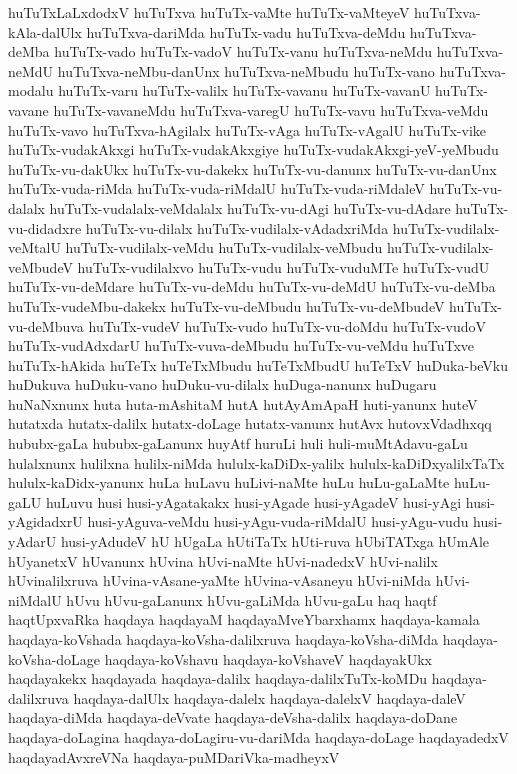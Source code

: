 {huTuTxLaLxdodxV
huTuTxva
huTuTx-vaMte
huTuTx-vaMteyeV
huTuTxva-kAla-dalUlx
huTuTxva-dariMda
huTuTx-vadu
huTuTxva-deMdu
huTuTxva-deMba
huTuTx-vado
huTuTx-vadoV
huTuTx-vanu
huTuTxva-neMdu
huTuTxva-neMdU
huTuTxva-neMbu-danUnx
huTuTxva-neMbudu
huTuTx-vano
huTuTxva-modalu
huTuTx-varu
huTuTx-valilx
huTuTx-vavanu
huTuTx-vavanU
huTuTx-vavane
huTuTx-vavaneMdu
huTuTxva-varegU
huTuTx-vavu
huTuTxva-veMdu
huTuTx-vavo
huTuTxva-hAgilalx
huTuTx-vAga
huTuTx-vAgalU
huTuTx-vike
huTuTx-vudakAkxgi
huTuTx-vudakAkxgiye
huTuTx-vudakAkxgi-yeV-yeMbudu
huTuTx-vu-dakUkx
huTuTx-vu-dakekx
huTuTx-vu-danunx
huTuTx-vu-danUnx
huTuTx-vuda-riMda
huTuTx-vuda-riMdalU
huTuTx-vuda-riMdaleV
huTuTx-vu-dalalx
huTuTx-vudalalx-veMdalalx
huTuTx-vu-dAgi
huTuTx-vu-dAdare
huTuTx-vu-didadxre
huTuTx-vu-dilalx
huTuTx-vudilalx-vAdadxriMda
huTuTx-vudilalx-veMtalU
huTuTx-vudilalx-veMdu
huTuTx-vudilalx-veMbudu
huTuTx-vudilalx-veMbudeV
huTuTx-vudilalxvo
huTuTx-vudu
huTuTx-vuduMTe
huTuTx-vudU
huTuTx-vu-deMdare
huTuTx-vu-deMdu
huTuTx-vu-deMdU
huTuTx-vu-deMba
huTuTx-vudeMbu-dakekx
huTuTx-vu-deMbudu
huTuTx-vu-deMbudeV
huTuTx-vu-deMbuva
huTuTx-vudeV
huTuTx-vudo
huTuTx-vu-doMdu
huTuTx-vudoV
huTuTx-vudAdxdarU
huTuTx-vuva-deMbudu
huTuTx-vu-veMdu
huTuTxve
huTuTx-hAkida
huTeTx
huTeTxMbudu
huTeTxMbudU
huTeTxV
huDuka-beVku
huDukuva
huDuku-vano
huDuku-vu-dilalx
huDuga-nanunx
huDugaru
huNaNxnunx
huta
huta-mAshitaM
hutA
hutAyAmApaH
huti-yanunx
huteV
hutatxda
hutatx-dalilx
hutatx-doLage
hutatx-vanunx
hutAvx
hutovxVdadhxqq
hububx-gaLa
hububx-gaLanunx
huyAtf
huruLi
huli
huli-muMtAdavu-gaLu
hulalxnunx
hulilxna
hulilx-niMda
hululx-kaDiDx-yalilx
hululx-kaDiDxyalilxTaTx
hululx-kaDidx-yanunx
huLa
huLavu
huLivi-naMte
huLu
huLu-gaLaMte
huLu-gaLU
huLuvu
husi
husi-yAgatakakx
husi-yAgade
husi-yAgadeV
husi-yAgi
husi-yAgidadxrU
husi-yAguva-veMdu
husi-yAgu-vuda-riMdalU
husi-yAgu-vudu
husi-yAdarU
husi-yAdudeV
hU
hUgaLa
hUtiTaTx
hUti-ruva
hUbiTATxga
hUmAle
hUyanetxV
hUvanunx
hUvina
hUvi-naMte
hUvi-nadedxV
hUvi-nalilx
hUvinalilxruva
hUvina-vAsane-yaMte
hUvina-vAsaneyu
hUvi-niMda
hUvi-niMdalU
hUvu
hUvu-gaLanunx
hUvu-gaLiMda
hUvu-gaLu
haq
haqtf
haqtUpxvaRka
haqdaya
haqdayaM
haqdayaMveYbarxhamx
haqdaya-kamala
haqdaya-koVshada
haqdaya-koVsha-dalilxruva
haqdaya-koVsha-diMda
haqdaya-koVsha-doLage
haqdaya-koVshavu
haqdaya-koVshaveV
haqdayakUkx
haqdayakekx
haqdayada
haqdaya-dalilx
haqdaya-dalilxTuTx-koMDu
haqdaya-dalilxruva
haqdaya-dalUlx
haqdaya-dalelx
haqdaya-dalelxV
haqdaya-daleV
haqdaya-diMda
haqdaya-deVvate
haqdaya-deVsha-dalilx
haqdaya-doDane
haqdaya-doLagina
haqdaya-doLagiru-vu-dariMda
haqdaya-doLage
haqdayadedxV
haqdayadAvxreVNa
haqdaya-puMDariVka-madheyxV
}
